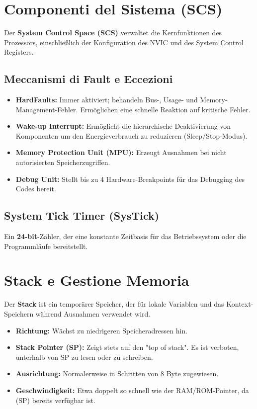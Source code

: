 
\section{Componenti del Sistema (SCS)}
Der \textbf{System Control Space (SCS)} verwaltet die Kernfunktionen des Prozessors, einschließlich der Konfiguration des NVIC und des System Control Registers.

\subsection{Meccanismi di Fault e Eccezioni}
\begin{itemize}
    \item \textbf{HardFaults:} Immer aktiviert; behandeln Bus-, Usage- und Memory-Management-Fehler. Ermöglichen eine schnelle Reaktion auf kritische Fehler.
    \item \textbf{Wake-up Interrupt:} Ermöglicht die hierarchische Deaktivierung von Komponenten
     um den Energieverbrauch zu reduzieren (Sleep/Stop-Modus).
    \item \textbf{Memory Protection Unit (MPU):} Erzeugt Ausnahmen bei nicht autorisierten Speicherzugriffen.
    \item \textbf{Debug Unit:} Stellt bis zu 4 Hardware-Breakpoints für das Debugging des Codes bereit.
\end{itemize}

\subsection{System Tick Timer (SysTick)}
Ein \textbf{24-bit}-Zähler, der eine konstante Zeitbasis für das Betriebssystem oder die Programmläufe bereitstellt.

\section{Stack e Gestione Memoria}
Der \textbf{Stack} ist ein temporärer Speicher, der für lokale Variablen und das Kontext-Speichern während Ausnahmen verwendet wird.
\begin{itemize}
    \item \textbf{Richtung:} Wächst zu niedrigeren Speicheradressen hin.
    \item \textbf{Stack Pointer (SP):} Zeigt stets auf den "top of stack". Es ist verboten, unterhalb von SP zu lesen oder zu schreiben.
    \item \textbf{Ausrichtung:} Normalerweise in Schritten von 8 Byte zugewiesen.
    \item \textbf{Geschwindigkeit:} Etwa doppelt so schnell wie der RAM/ROM-Pointer, da (SP) bereits verfügbar ist.
\end{itemize}

